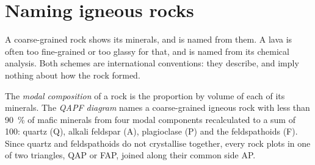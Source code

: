 \section{Naming igneous rocks}\label{sec:b2:magmatic-series:naming}

A coarse-grained rock shows its minerals, and is named from them. A lava is often too
fine-grained or too glassy for that, and is named from its chemical analysis. Both
schemes are international conventions: they describe, and imply nothing about how
the rock formed.

\begin{definition}\label{def:b2:magmatic-series:qapf}
The \emph{modal composition} of a rock is the proportion by
volume of each of its minerals. The \emph{QAPF diagram} names a
coarse-grained igneous rock with less than \qty{90}{\percent} of mafic minerals from
four modal components recalculated to a sum of 100: quartz (Q), alkali feldspar
(A), plagioclase (P) and the feldspathoids (F). Since quartz and feldspathoids do not
crystallise together, every rock plots in one of two triangles, QAP or FAP, joined
along their common side AP.
\end{definition}

